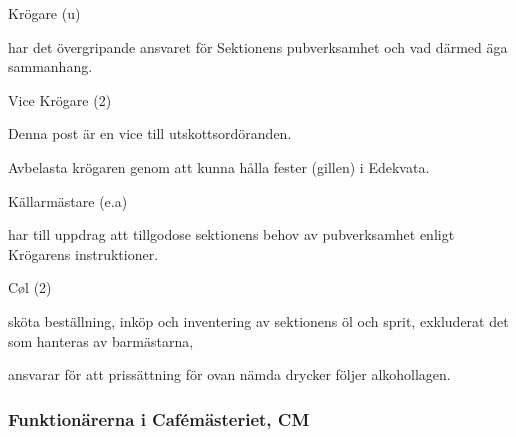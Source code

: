 \documentclass[10pt]{article}
\begin{document}
\begin{emptylist}
    \item Krögare (u)
        \begin{dashlist}
            \item har det övergripande ansvaret för Sektionens pubverksamhet
                och vad därmed äga sammanhang.
        \end{dashlist}
    \item Vice Krögare (2)
        \begin{dashlist}
        \item Denna post är en vice till utskottsordöranden.
        \item Avbelasta krögaren genom att kunna hålla fester (gillen) i
            Edekvata.
        \end{dashlist}
    \item Källarmästare (e.a)
        \begin{dashlist}
            \item har till uppdrag att tillgodose sektionens behov av
                pubverksamhet enligt Krögarens instruktioner.
        \end{dashlist}
    \item Cøl (2)
        \begin{dashlist}
            \item sköta beställning, inköp och inventering av sektionens öl
                och sprit, exkluderat det som hanteras av barmästarna,
            \item ansvarar för att prissättning för ovan nämda drycker
                följer alkohollagen.
        \end{dashlist}
\end{emptylist}
\subsubsection{Funktionärerna i Cafémästeriet, CM}
\end{document}
